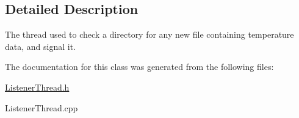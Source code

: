\subsection{Detailed Description}
The thread used to check a directory for any new file containing temperature data, and signal it. 

The documentation for this class was generated from the following files\+:\begin{DoxyCompactItemize}
\item 
\hyperlink{ListenerThread_8h}{Listener\+Thread.\+h}\item 
Listener\+Thread.\+cpp\end{DoxyCompactItemize}
